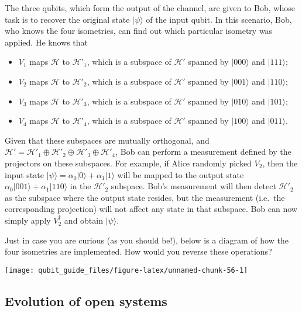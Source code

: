 \documentclass[fleqn]{article}
\providecommand{\tightlist}{%
  \setlength{\itemsep}{0pt}\setlength{\parskip}{0pt}}
\begin{document}
The three qubits, which form the output of the channel, are given to Bob, whose task is to recover the original state \(|\psi\rangle\) of the input qubit.
In this scenario, Bob, who knows the four isometries, can find out which particular isometry was applied.
He knows that

\begin{itemize}
\tightlist
\item
  \(V_1\) maps \(\mathcal{H}\) to \(\mathcal{H}'_1\), which is a subspace of \(\mathcal{H}'\) spanned by \(|000\rangle\) and \(|111\rangle\);
\item
  \(V_2\) maps \(\mathcal{H}\) to \(\mathcal{H}'_2\), which is a subspace of \(\mathcal{H}'\) spanned by \(|001\rangle\) and \(|110\rangle\);
\item
  \(V_3\) maps \(\mathcal{H}\) to \(\mathcal{H}'_3\), which is a subspace of \(\mathcal{H}'\) spanned by \(|010\rangle\) and \(|101\rangle\);
\item
  \(V_4\) maps \(\mathcal{H}\) to \(\mathcal{H}'_4\), which is a subspace of \(\mathcal{H}'\) spanned by \(|100\rangle\) and \(|011\rangle\).
\end{itemize}

Given that these subspaces are mutually orthogonal, and \(\mathcal{H}'=\mathcal{H}'_1\oplus\mathcal{H}'_2\oplus\mathcal{H}'_3\oplus\mathcal{H}'_4\), Bob can perform a measurement defined by the projectors on these subspaces.
For example, if Alice randomly picked \(V_2\), then the input state \(|\psi\rangle=\alpha_0|0\rangle+\alpha_1|1\rangle\) will be mapped to the output state \(\alpha_0|001\rangle+\alpha_1|110\rangle\) in the \(\mathcal{H}'_2\) subspace.
Bob's measurement will then detect \(\mathcal{H}'_2\) as the subspace where the output state resides, but the measurement (i.e.~the corresponding projection) will not affect any state in that subspace.
Bob can now simply apply \(V_2^\dagger\) and obtain \(|\psi\rangle\).

Just in case you are curious (as you should be!), below is a diagram of how the four isometries are implemented.
How would you reverse these operations?

\begin{center}\texttt{[image: qubit\_guide\_files/figure-latex/unnamed-chunk-56-1]} \end{center}

\hypertarget{evolution-of-open-systems}{%
\subsection{Evolution of open systems}\label{evolution-of-open-systems}}
\end{document}
